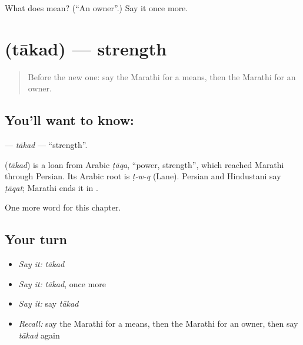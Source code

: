 \begin{tcolorbox}[breakable,colback=teal!4,colframe=teal!35!black,title={Before you move on}]
What does  mean? (\textquotedblleft{}An owner\textquotedblright{}.) Say it once more.
\end{tcolorbox}
\section[\texorpdfstring{\mr{ताकद} (tākad)}{ताकद (tākad)}]{ (tākad) — strength}

\label{lesson:MR-C122-takad}



\begin{quote}
Before the new one: say the Marathi for a means, then the Marathi for an owner.
\end{quote}

\subsection*{You'll want to know: }
\textbf{} — \emph{tākad} — \textquotedblleft{}strength\textquotedblright{}.

\begin{cousinweb}
\textbf{} (\emph{tākad}) is a loan from Arabic \emph{ṭāqa}, \textquotedblleft{}power, strength\textquotedblright{}, which reached Marathi through Persian. Its Arabic root is \emph{ṭ-w-q} (Lane). Persian and Hindustani say \emph{ṭāqat}; Marathi ends it in \textbf{}.
\end{cousinweb}

\begin{grammarlens}[title={What you've built}]
One more word for this chapter.
\end{grammarlens}

\subsection*{Your turn}
\begin{itemize}
\raggedright
  \item \emph{Say it:} \emph{tākad}
  \item \emph{Say it:} \emph{tākad}, once more
  \item \emph{Say it:} say \emph{tākad}
  \item \emph{Recall:} say the Marathi for a means, then the Marathi for an owner, then say \emph{tākad} again
\end{itemize}

